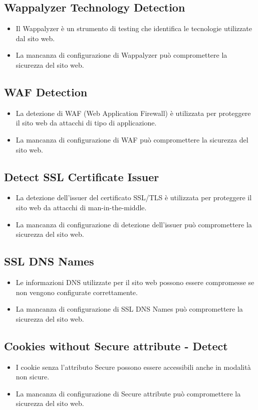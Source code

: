 \subsection{Wappalyzer Technology Detection}
\begin{itemize}
\item Il Wappalyzer è un strumento di testing che identifica le tecnologie utilizzate dal sito web.
\item La mancanza di configurazione di Wappalyzer può compromettere la sicurezza del sito web.
\end{itemize}
\subsection{WAF Detection}
\begin{itemize}
\item La detezione di WAF (Web Application Firewall) è utilizzata per proteggere il sito web da attacchi di tipo di applicazione.
\item La mancanza di configurazione di WAF può compromettere la sicurezza del sito web.
\end{itemize}
\subsection{Detect SSL Certificate Issuer}
\begin{itemize}
\item La detezione dell'issuer del certificato SSL/TLS è utilizzata per proteggere il sito web da attacchi di man-in-the-middle.
\item La mancanza di configurazione di detezione dell'issuer può compromettere la sicurezza del sito web.
\end{itemize}
\subsection{SSL DNS Names}
\begin{itemize}
\item Le informazioni DNS utilizzate per il sito web possono essere compromesse se non vengono configurate correttamente.
\item La mancanza di configurazione di SSL DNS Names può compromettere la sicurezza del sito web.
\end{itemize}
\subsection{Cookies without Secure attribute - Detect}
\begin{itemize}
\item I cookie senza l'attributo Secure possono essere accessibili anche in modalità non sicure.
\item La mancanza di configurazione di Secure attribute può compromettere la sicurezza del sito web.
\end{itemize}
